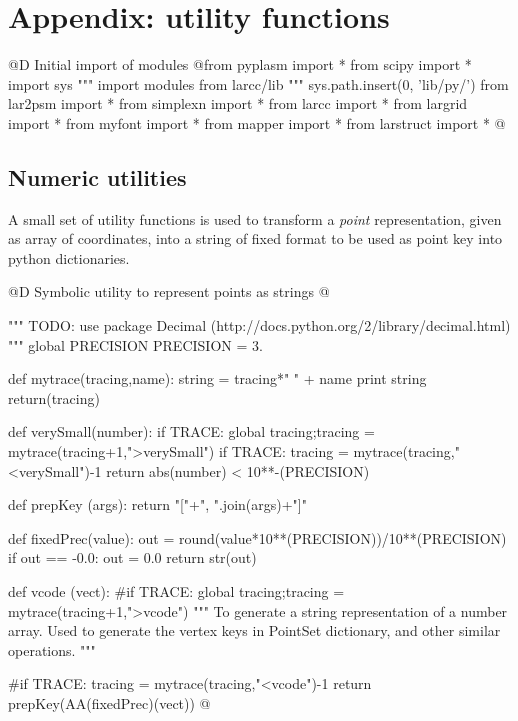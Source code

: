 \documentclass[11pt,oneside]{article}	%
\begin{document}
\appendix
\section{Appendix: utility functions}
@D Initial import of modules
@{from pyplasm import *
from scipy import *
import sys
""" import modules from larcc/lib """
sys.path.insert(0, 'lib/py/')
from lar2psm import *
from simplexn import *
from larcc import *
from largrid import *
from myfont import *
from mapper import *
from larstruct import *
@}
\subsection{Numeric utilities}

A small set of utility functions is used to transform a \emph{point} representation, given as array of coordinates, into a string of fixed format to be used as point key into python dictionaries.

@D Symbolic utility to represent points as strings
@{""" TODO: use package Decimal (http://docs.python.org/2/library/decimal.html) """
global PRECISION
PRECISION = 3.

def mytrace(tracing,name):
	string = tracing*"  " + name
	print string
	return(tracing)

def verySmall(number): 
	if TRACE: global tracing;tracing = mytrace(tracing+1,">verySmall")
	if TRACE: tracing = mytrace(tracing,"<verySmall")-1
	return abs(number) < 10**-(PRECISION)

def prepKey (args): 
	return "["+", ".join(args)+"]"

def fixedPrec(value):
	out = round(value*10**(PRECISION))/10**(PRECISION)
	if out == -0.0: out = 0.0
	return str(out)
	
def vcode (vect): 
	#if TRACE: global tracing;tracing = mytrace(tracing+1,">vcode")
	"""
	To generate a string representation of a number array.
	Used to generate the vertex keys in PointSet dictionary, and other similar operations.
	"""

	#if TRACE: tracing = mytrace(tracing,"<vcode")-1
	return prepKey(AA(fixedPrec)(vect))
@}




\end{document}
